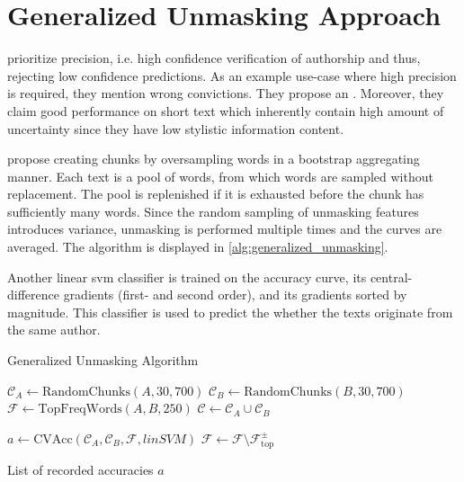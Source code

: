 \section{Generalized Unmasking Approach}
\label{sec:generalized_unmasking_approach}

\citet{bevendorff_generalizing_2019} prioritize precision, 
i.e. high confidence verification of authorship and thus, rejecting low confidence predictions.
As an example use-case where high precision is required, they mention wrong convictions.
They propose an . %
Moreover, they claim good performance on short text which inherently contain high amount of uncertainty since they have low stylistic information content.

\citet{bevendorff_generalizing_2019} propose creating chunks by oversampling words in a bootstrap aggregating manner. 
Each text is a pool of words, from which words are sampled without replacement.
The pool is replenished if it is exhausted before the chunk has sufficiently many words.
Since the random sampling of unmasking features introduces variance, unmasking is performed multiple times and the curves are averaged.
The algorithm is displayed in \autoref{alg:generalized_unmasking}.

Another linear \ac{svm} classifier is trained on the accuracy curve, its central-difference gradients (first- and second order), 
and its gradients sorted by magnitude.
This classifier is used to predict the whether the texts originate from the same author.

\begin{algorithm}
    \caption{Generalized Unmasking Algorithm}
    \label{alg:generalized_unmasking}
    \begin{algorithmic}[1]
    
        \State $\mathcal{C}_A \gets \text{RandomChunks}(A, 30, 700)$ 
        \State $\mathcal{C}_B \gets \text{RandomChunks}(B, 30, 700)$
        \State $\mathcal{F} \gets \text{TopFreqWords}(A, B, 250)$
        \State $\mathcal{C} \gets \mathcal{C}_A \cup \mathcal{C}_B$

        
        \State $a \gets \text{CVAcc}(\mathcal{C}_A, \mathcal{C}_B, \mathcal{F}, linSVM)$ 
        \State $\mathcal{F} \gets \mathcal{F} \setminus \mathcal{F}_{\text{top}}^{\pm}$ 
    
        \EndWhile
    
        \State \Return List of recorded accuracies $a$
    \EndProcedure
    \end{algorithmic}
\end{algorithm}

